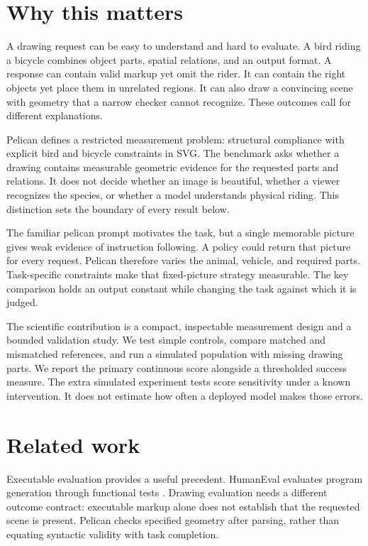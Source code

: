 \documentclass{article}
\title{\paperTitle}
\author{Pooria Arab\\Independent researcher\\\href{https://orcid.org/\authorOrcid}{ORCID \authorOrcid}}
\begin{document}
\maketitle
\begin{abstract}\paperAbstract\end{abstract}
\section{Why this matters}
A drawing request can be easy to understand and hard to evaluate. A bird riding a bicycle combines object parts, spatial relations, and an output format. A response can contain valid markup yet omit the rider. It can contain the right objects yet place them in unrelated regions. It can also draw a convincing scene with geometry that a narrow checker cannot recognize. These outcomes call for different explanations.

Pelican defines a restricted measurement problem: structural compliance with explicit bird and bicycle constraints in SVG. The benchmark asks whether a drawing contains measurable geometric evidence for the requested parts and relations. It does not decide whether an image is beautiful, whether a viewer recognizes the species, or whether a model understands physical riding. This distinction sets the boundary of every result below.

The familiar pelican prompt motivates the task, but a single memorable picture gives weak evidence of instruction following. A policy could return that picture for every request. Pelican therefore varies the animal, vehicle, and required parts. Task-specific constraints make that fixed-picture strategy measurable. The key comparison holds an output constant while changing the task against which it is judged.

The scientific contribution is a compact, inspectable measurement design and a bounded validation study. We test simple controls, compare matched and mismatched references, and run a simulated population with missing drawing parts. We report the primary continuous score alongside a thresholded success measure. The extra simulated experiment tests score sensitivity under a known intervention. It does not estimate how often a deployed model makes those errors.

\section{Related work}
Executable evaluation provides a useful precedent. HumanEval evaluates program generation through functional tests \citep{chen}. Drawing evaluation needs a different outcome contract: executable markup alone does not establish that the requested scene is present. Pelican checks specified geometry after parsing, rather than equating syntactic validity with task completion.
\end{document}
